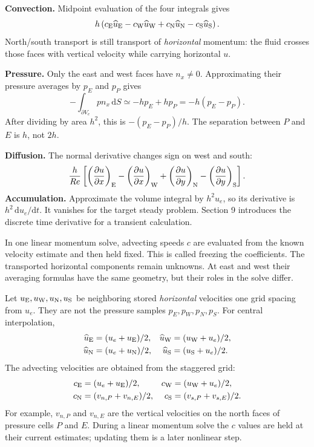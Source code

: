 \textbf{Convection.} Midpoint evaluation of the four integrals gives
\[
h\left(c_{\rm E}\widehat u_{\rm E}-c_{\rm W}\widehat u_{\rm W}
+c_{\rm N}\widehat u_{\rm N}-c_{\rm S}\widehat u_{\rm S}\right).
\]
North/south transport is still transport of \emph{horizontal} momentum: the
fluid crosses those faces with vertical velocity while carrying horizontal $u$.

\textbf{Pressure.} Only the east and west faces have $n_x\ne0$.
Approximating their pressure averages by $p_E$ and $p_P$ gives
\[
-\int_{\partial V_e}p n_x\,\mathrm dS
\simeq -h p_E+h p_P=-h(p_E-p_P).
\]
After dividing by area $h^2$, this is $-(p_E-p_P)/h$.
The separation between $P$ and $E$ is $h$, not $2h$.

\textbf{Diffusion.} The normal derivative changes sign on west and south:
\[
\frac{h}{Re}\left[
\left(\frac{\partial u}{\partial x}\right)_{\rm E}
-\left(\frac{\partial u}{\partial x}\right)_{\rm W}
+\left(\frac{\partial u}{\partial y}\right)_{\rm N}
-\left(\frac{\partial u}{\partial y}\right)_{\rm S}\right].
\]
\textbf{Accumulation.} Approximate the volume integral by $h^2u_e$, so its
derivative is $h^2\,\mathrm du_e/\mathrm dt$. It vanishes for the target steady
problem. Section 9 introduces the discrete time derivative for a transient calculation.
\newpage

\newpage
{}
In one linear momentum solve, advecting speeds $c$ are evaluated from the
known velocity estimate and then held fixed. This is called freezing the
coefficients. The transported horizontal components remain unknowns. At east and west their
averaging formulas have the same geometry, but their roles in the solve differ.

Let $u_{\rm E},u_{\rm W},u_{\rm N},u_{\rm S}$ be neighboring stored
\emph{horizontal} velocities one grid spacing from $u_e$. They are not the
pressure samples $p_E,p_W,p_N,p_S$. For central interpolation,
\begin{align*}
\widehat u_{\rm E}&=(u_e+u_{\rm E})/2,&
\widehat u_{\rm W}&=(u_{\rm W}+u_e)/2,\\
\widehat u_{\rm N}&=(u_e+u_{\rm N})/2,&
\widehat u_{\rm S}&=(u_{\rm S}+u_e)/2.
\end{align*}
The advecting velocities are obtained from the staggered grid:
\begin{align*}
c_{\rm E}&=(u_e+u_{\rm E})/2,&c_{\rm W}&=(u_{\rm W}+u_e)/2,\\
c_{\rm N}&=(v_{n,P}+v_{n,E})/2,&c_{\rm S}&=(v_{s,P}+v_{s,E})/2.
\end{align*}
For example, $v_{n,P}$ and $v_{n,E}$ are the vertical velocities on the north
faces of pressure cells $P$ and $E$. During a linear momentum solve the $c$
values are held at their current estimates; updating them is a later nonlinear step.

